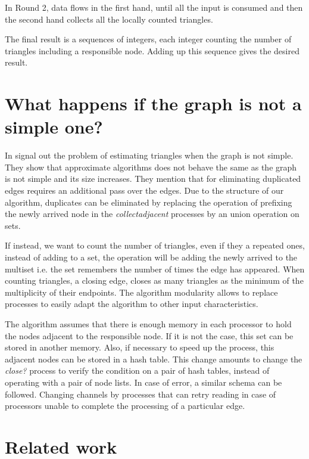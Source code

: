 \documentclass{article}                     \usepackage{graphics}
\begin{document}
In Round 2, data flows in the first hand, until all the input is consumed and then the second hand collects all the locally counted triangles.

The final result is a sequences of integers, each integer counting the number of triangles including a responsible node. Adding up this sequence gives the desired result.
\section{What happens if the graph is not a simple one?}



In \cite{DBLP:journals/corr/JhaSP13} signal out the problem of estimating triangles when the graph is not simple. They show that approximate algorithms does not behave the same as the graph is not simple and its size increases.  They mention that for eliminating duplicated edges requires an additional  pass over the edges. Due to the structure of our algorithm, duplicates can be eliminated by replacing the operation of prefixing the newly arrived node in the  \textit{collectadjacent} processes by an union operation on sets.  

If instead, we want to count the number of triangles, even if they a repeated ones, instead of adding to a set, the operation will be adding the newly arrived to the multiset i.e. the set remembers the number of times the edge has appeared. When counting triangles, a closing edge, closes as many triangles as the minimum of the multiplicity of their endpoints. The algorithm  modularity allows to replace processes to easily adapt the algorithm  to other input characteristics.

The algorithm assumes that there is enough memory in each processor to hold the nodes adjacent to the responsible node. If it is not the case, this set can be stored in another memory.  Also, if necessary to speed up the process, this adjacent nodes can be stored in a hash table. This change amounts to change the \textit{close?} process to verify the condition on a pair of hash tables, instead of operating with a pair of node lists.
 In case of error, a similar schema can be followed.  Changing channels by processes that can retry reading in case of processors unable to complete the processing of a particular edge.




\section{Related work}
\end{document}
